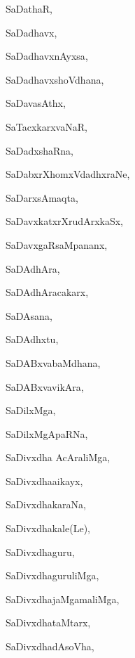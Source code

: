 \begin{multicols}{3}
{\noindent
{SaDathaR}, \pageref{SaDathaR}

\noindent
{SaDadhavx}, \pageref{SaDadhavx}

\noindent
{SaDadhavxnAyxsa}, \pageref{SaDadhavxnAyxsa}

\noindent
{SaDadhavxshoVdhana}, \pageref{SaDadhavxshoVdhana}

\noindent
{SaDavasAthx}, \pageref{SaDavasAthx}

\noindent
{SaTacxkarxvaNaR}, \pageref{SaTacxkarxvaNaR}

\noindent
{SaDadxshaRna}, \pageref{SaDadxshaRna}

\noindent
{SaDabxrXhomxVdadhxraNe}, \pageref{SaDabxrXhomxVdadhxraNe}

\noindent
{SaDarxsAmaqta}, \pageref{SaDarxsAmaqta}

\noindent
{SaDavxkatxrXrudArxkaSx}, \pageref{SaDavxkatxrXrudArxkaSx}

\noindent
{SaDavxgaRsaMpananx}, \pageref{SaDavxgaRsaMpananx}

\noindent
{SaDAdhAra}, \pageref{SaDAdhAra}

\noindent
{SaDAdhAracakarx}, \pageref{SaDAdhAracakarx}

\noindent
{SaDAsana}, \pageref{SaDAsana}

\noindent
{SaDAdhxtu}, \pageref{SaDAdhxtu}

\noindent
{SaDABxvabaMdhana}, \pageref{SaDABxvabaMdhana}

\noindent
{SaDABxvavikAra}, \pageref{SaDABxvavikAra}

\noindent
{SaDilxMga}, \pageref{SaDilxMga}

\noindent
{SaDilxMgApaRNa}, \pageref{SaDilxMgApaRNa}

\noindent
{SaDivxdha AcAraliMga}, \pageref{SaDivxdhaAcAraliMga}

\noindent
{SaDivxdha{ai}kayx}, 

\noindent
{SaDivxdhakaraNa}, \pageref{SaDivxdhakaraNa}

\noindent
{SaDivxdhakale(Le)}, \pageref{SaDivxdhakaleLe}

\noindent
{SaDivxdhaguru}, \pageref{SaDivxdhaguru}

\noindent
{SaDivxdhaguruliMga}, \pageref{SaDivxdhaguruliMga}

\noindent
{SaDivxdhajaMgamaliMga}, \pageref{SaDivxdhajaMgamaliMga}

\noindent
{SaDivxdhataMtarx}, \pageref{SaDivxdhataMtarx}

\noindent
{SaDivxdhadAsoVha}, \pageref{SaDivxdhadAsoVha}

}
\end{multicols}
